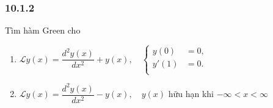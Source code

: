 \documentclass{report}
\begin{document}
\subsubsection{10.1.2}
Tìm hàm Green cho
\begin{enumerate}[label=(\alph*)]
	\item $\mathcal{L} y(x) = \dfrac{d^2 y(x)}{dx^2} + y(x) ,\quad
		      \begin{cases}
			      y(0)  & = 0, \\
			      y'(1) & = 0. \\
		      \end{cases}$
	\item  $\mathcal{L} y(x) = \dfrac{d^2 y(x)}{dx^2} - y(x) , \quad y(x)$ hữu hạn khi $-\infty < x < \infty$\\
\end{enumerate}
\end{document}
